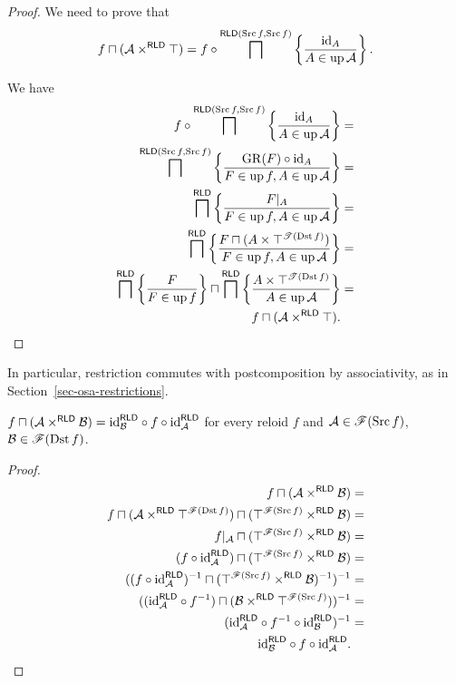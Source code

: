 \begin{proof}
We need to prove that 
\[
f\sqcap(\mathcal{A}\times^{\mathsf{RLD}}\top)=f\circ\bigsqcap^{\mathsf{RLD}(\operatorname{Src} f,\operatorname{Src} f)}\left\{ \frac{{\operatorname{id}}_{A}}{A\in\operatorname{up}\mathcal{A}}\right\}.
\]


We have
\begin{align*}
f\circ\bigsqcap^{\mathsf{RLD}(\operatorname{Src} f,\operatorname{Src} f)}\left\{ \frac{{\operatorname{id}}_{A}}{A\in\operatorname{up}\mathcal{A}}\right\} & =\\
\bigsqcap^{\mathsf{RLD}(\operatorname{Src} f,\operatorname{Src} f)}\left\{ \frac{\operatorname{GR}(F)\circ{\operatorname{id}}_{A}}{F\in\operatorname{up} f,A\in\operatorname{up}\mathcal{A}}\right\} & =\\
\bigsqcap^{\mathsf{RLD}}\left\{ \frac{F|_{A}}{F\in\operatorname{up} f,A\in\operatorname{up}\mathcal{A}}\right\} & =\\
\bigsqcap^{\mathsf{RLD}}\left\{ \frac{F\sqcap(A\times\top^{\mathscr{T}(\operatorname{Dst} f)})}{F\in\operatorname{up} f,A\in\operatorname{up}\mathcal{A}}\right\} & =\\
\bigsqcap^{\mathsf{RLD}}\left\{ \frac{F}{F\in\operatorname{up} f}\right\}\sqcap\bigsqcap^{\mathsf{RLD}}\left\{ \frac{A\times\top^{\mathscr{T}(\operatorname{Dst} f)}}{A\in\operatorname{up}\mathcal{A}}\right\} & =\\
f\sqcap(\mathcal{A}\times^{\mathsf{RLD}}\top).
\end{align*}
\end{proof}
In particular, restriction commutes with postcomposition by
associativity, as in Section~\ref{sec-osa-restrictions}.
\begin{thm}\label{thm-rld-rectangle-meet}
$f\sqcap(\mathcal{A}\times^{\mathsf{RLD}}\mathcal{B})={\operatorname{id}}_{\mathcal{B}}^{\mathsf{\mathsf{RLD}}}\circ f\circ{\operatorname{id}}_{\mathcal{A}}^{\mathsf{\mathsf{RLD}}}$
for every reloid $f$ and $\mathcal{A}\in\mathscr{F}(\operatorname{Src} f)$, $\mathcal{B}\in\mathscr{F}(\operatorname{Dst} f)$.\end{thm}
\begin{proof}
~
\begin{align*}
f\sqcap(\mathcal{A}\times^{\mathsf{RLD}}\mathcal{B}) & =\\
f\sqcap(\mathcal{A}\times^{\mathsf{RLD}}\top^{\mathscr{F}(\operatorname{Dst} f)})\sqcap(\top^{\mathscr{F}(\operatorname{Src} f)}\times^{\mathsf{RLD}}\mathcal{B}) & =\\
f|_{\mathcal{A}}\sqcap(\top^{\mathscr{F}(\operatorname{Src} f)}\times^{\mathsf{RLD}}\mathcal{B}) & =\\
(f\circ{\operatorname{id}}_{\mathcal{A}}^{\mathsf{\mathsf{RLD}}})\sqcap(\top^{\mathscr{F}(\operatorname{Src} f)}\times^{\mathsf{RLD}}\mathcal{B}) & =\\
((f\circ{\operatorname{id}}_{\mathcal{A}}^{\mathsf{\mathsf{RLD}}})^{-1}\sqcap(\top^{\mathscr{F}(\operatorname{Src} f)}\times^{\mathsf{RLD}}\mathcal{B})^{-1})^{-1} & =\\
(({\operatorname{id}}_{\mathcal{A}}^{\mathsf{\mathsf{RLD}}}\circ f^{-1})\sqcap(\mathcal{B}\times^{\mathsf{RLD}}\top^{\mathscr{F}(\operatorname{Src} f)}))^{-1} & =\\
({\operatorname{id}}_{\mathcal{A}}^{\mathsf{\mathsf{RLD}}}\circ f^{-1}\circ{\operatorname{id}}_{\mathcal{B}}^{\mathsf{\mathsf{RLD}}})^{-1} & =\\
{\operatorname{id}}_{\mathcal{B}}^{\mathsf{\mathsf{RLD}}}\circ f\circ{\operatorname{id}}_{\mathcal{A}}^{\mathsf{\mathsf{RLD}}}.
\end{align*}
\end{proof}


